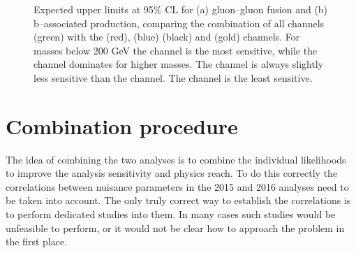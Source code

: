 \begin{figure}[h!]
\begin{center}
\end{center}
\caption{Expected upper limits at 95\% CL for (a) gluon--gluon fusion and (b) b--associated production,
comparing the combination of all channels (green) with the \mutau (red), \etau (blue) \tautau (black)
and \emu (gold) channels. For masses below 200 GeV the \mutau channel is the most sensitive,
while the \tautau channel dominates for higher masses. The \etau channel is always
slightly less sensitive than the \mutau channel. The \emu channel is the least sensitive.}
\label{fig:mssm_results_limits_breakdown_hig16006}
\end{figure}
\clearpage


\section{Combination procedure}
\label{sec:mssm_combination_procedure}
The idea of combining the two analyses is to combine the 
individual likelihoods to improve the analysis sensitivity and
physics reach. To do this correctly the correlations between
nuisance parameters in the 2015 and 2016 analyses need to be taken into account.
The only truly correct way to establish the correlations is to perform
dedicated studies into them. In many cases such studies would be 
unfeasible to perform, or it would not be clear how to approach the 
problem in the first place.


